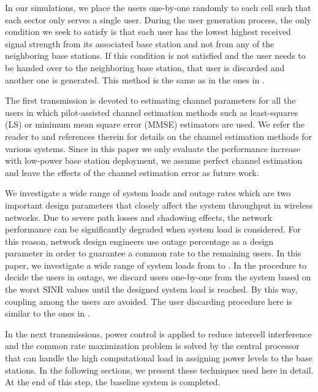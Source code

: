 \documentclass[conference,letterpaper,final,10pt]{IEEEtran}
\begin{document}
In our simulations, we place the users one-by-one randomly to each cell such that each sector only serves a single user. During the user generation process, the only condition we seek to satisfy is that each user has the lowest highest received signal strength from its associated base station and not from any of the neighboring base stations. If this condition is not satisfied and the user needs to be handed over to the neighboring base station, that user is discarded and another one is generated. This method is the same as in the ones in \cite{RamanConf,Karakayali}.

The first transmission is devoted to estimating channel parameters for all the users in which pilot-assisted channel estimation methods such as least-squares (LS) or minimum mean square error (MMSE) estimators are used. We refer the reader to \cite{channelest1,channelest2,channelest3} and references therein for details on the channel estimation methods for various systems. Since in this paper we only evaluate the performance increase with low-power base station deployment, we assume perfect channel estimation and leave the effects of the channel estimation error as future work.

We investigate a wide range of system loads and outage rates which are two important design parameters that closely affect the system throughput in wireless networks. Due to severe path losses and shadowing effects, the network performance can be significantly degraded when  system load is considered. For this reason, network design engineers use outage percentage as a design parameter in order to guarantee a common rate to the remaining users. In this paper, we investigate a wide range of system loads from  to . In the procedure to decide the users in outage, we discard users one-by-one from the system based on the worst SINR values until the designed system load is reached. By this way, coupling among the users are avoided. The user discarding procedure here is similar to the ones in \cite{Karakayali,RamanConf}.

In the next transmissions, power control is applied to reduce intercell interference and the common rate maximization problem is solved by the central processor that can handle the high computational load in assigning power levels to the base stations. In the following sections, we present these techniques used here in detail. At the end of this step, the baseline system is completed.
\end{document}
